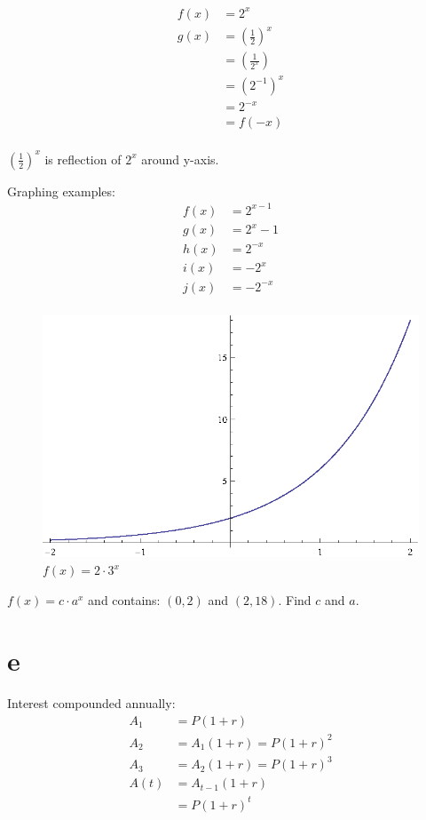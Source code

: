 \documentclass{exam}
\begin{document}
  \begin{align*}
    f(x) &= 2^x \\
    g(x) &= \left( \frac{1}{2} \right)^x \\
         &= \left( \frac{1}{2^x} \right) \\
         &= \left( 2^{-1} \right)^x \\
         &= 2^{-x} \\
         &= f(-x) \\
  \end{align*}

  $\left( \frac{1}{2} \right)^x$ is reflection of $2^x$ around y-axis.

  Graphing examples:
  \begin{align*}
    f(x) &= 2^{x - 1} \\
    g(x) &= 2^x - 1 \\
    h(x) &= 2^{-x} \\
    i(x) &= -2^x \\
    j(x) &= -2^{-x} \\
  \end{align*}

  \begin{figure}[h]
    \centering
    \includegraphics{figure1.eps}
    \caption{$f(x) = 2 \cdot 3^x$}
    \label{fig:figure1}
  \end{figure}

  $f(x) = c \cdot a^x$ and contains: $(0, 2)$ and $(2, 18)$.  Find $c$ and $a$.

  \section{e}

  Interest compounded annually:
  \begin{align*}
    A_1  &= P(1 + r) \\
    A_2  &= A_1(1 + r) = P(1 + r)^2 \\
    A_3  &= A_2(1 + r) = P(1 + r)^3 \\
    A(t) &= A_{t - 1}(1 + r) \\
         &= P(1 + r)^t \\
  \end{align*}
\end{document}

